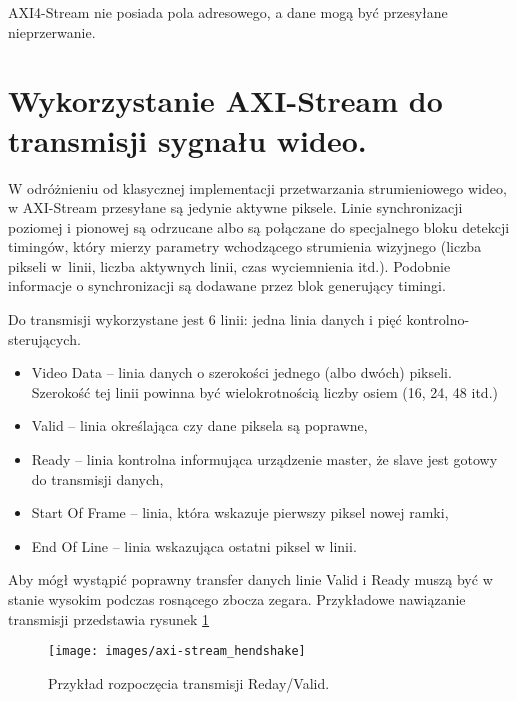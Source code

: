 
AXI4-Stream nie posiada pola adresowego, a dane mogą być przesyłane nieprzerwanie. 

\section{Wykorzystanie AXI-Stream do transmisji sygnału wideo.} 
W odróżnieniu od klasycznej implementacji przetwarzania strumieniowego wideo, w AXI-Stream przesyłane są jedynie aktywne piksele. %
Linie synchronizacji poziomej i pionowej są odrzucane albo są połączane do specjalnego bloku detekcji timingów, który mierzy parametry wchodzącego strumienia wizyjnego (liczba pikseli w~linii, liczba aktywnych linii, czas wyciemnienia itd.). 
Podobnie informacje o synchronizacji są dodawane przez blok generujący timingi.

Do transmisji wykorzystane jest 6 linii: jedna linia danych i pięć kontrolno-sterujących. 
\begin{itemize}
\item Video Data -- linia danych o szerokości jednego (albo dwóch) pikseli. Szerokość tej linii powinna być wielokrotnością liczby osiem (16, 24, 48 itd.)
\item Valid -- linia określająca czy dane piksela są poprawne,
\item Ready -- linia kontrolna informująca urządzenie master, że slave jest gotowy do transmisji danych, %
\item Start Of Frame -- linia, która wskazuje pierwszy piksel nowej ramki,
\item End Of Line -- linia wskazująca ostatni piksel w linii. %
\end{itemize}
Aby mógł wystąpić poprawny transfer danych linie Valid i Ready muszą być w stanie wysokim podczas rosnącego zbocza zegara. 
Przykładowe nawiązanie transmisji przedstawia rysunek \ref{fig:handshake}

\begin{figure}[h]
    \centering
    \texttt{[image: images/axi-stream\_hendshake]}
    \caption{Przykład rozpoczęcia transmisji Reday/Valid.}
    \label{fig:handshake}
\end{figure}

